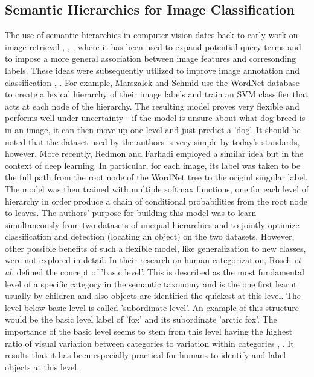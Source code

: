 \documentclass[12pt]{report}
\begin{document}
\subsection{Semantic Hierarchies for Image Classification}
The use of semantic hierarchies in computer vision dates back to early work on image retrieval \cite{Aslandogan1997}, \cite{Zhao2001}, \cite{Grosky2002} \cite{Barnard2001}, where it has been used to expand potential query terms and to impose a more general association between image features and corresonding labels. These ideas were subsequently utilized to improve image annotation and classification \cite{Srikanth2005}, \cite{Marszaek2007} \cite{Griffin2013}. For example, Marszalek and Schmid \cite{Marszaek2007} use the WordNet database to create a lexical hierarchy of their image labels and train an SVM classifier \cite{Scholkopf2002} that acts at each node of the hierarchy. The resulting model proves very flexible and performs well under uncertainty - if the model is unsure about what dog breed is in an image, it can then move up one level and just predict a 'dog'. It should be noted that the dataset used by the authors is very simple by today's standards, however. More recently, Redmon and Farhadi \cite{Redmon} employed a similar idea but in the context of deep learning. In particular, for each image, its label was taken to be the full path from the root node of the WordNet tree to the originl singular label. The model was then trained with multiple softmax functions, one for each level of hierarchy in order produce a chain of conditional probabilities from the root node to leaves. The authors' purpose for building this model was to learn simultaneously from two datasets of unequal hierarchies and to jointly optimize classification and detection (locating an object) on the two datasets. However, other possible benefits of such a flexible model, like generalization to new classes, were not explored in detail. 
In their research on human categorization, Rosch \textit{et al.} \cite{Rosch1976} defined the concept of 'basic level'. This is described as the most fundamental level of a specific category in the semantic taxonomy and is the one first learnt usually by children and also objects are identified the quickest at this level. The level below basic level is called 'subordinate level'. An example of this structure would be the basic level label of 'fox' and its subordinate 'arctic fox'. The importance of the basic level seems to stem from this level having the highest ratio of visual variation between categories to variation within categories \cite{Rosch1976}, \cite{Joliceur1984}. It results that it has been especially practical for humans to identify and label objects at this level. 
\end{document}
